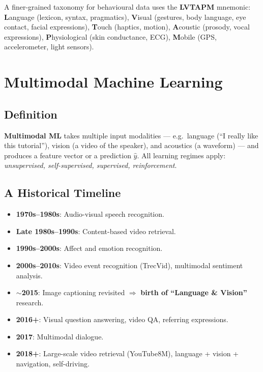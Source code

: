 \documentclass[11pt,a4paper]{article}
\theoremstyle{definition}
\theoremstyle{plain}
\theoremstyle{remark}
\begin{document}
A finer-grained taxonomy for behavioural data uses the \textbf{LVTAPM} mnemonic: \textbf{L}anguage (lexicon, syntax, pragmatics), \textbf{V}isual (gestures, body language, eye contact, facial expressions), \textbf{T}ouch (haptics, motion), \textbf{A}coustic (prosody, vocal expressions), \textbf{P}hysiological (skin conductance, ECG), \textbf{M}obile (GPS, accelerometer, light sensors).


\section{Multimodal Machine Learning}

\subsection{Definition}

\textbf{Multimodal ML} takes multiple input modalities --- e.g.\ language (``I really like this tutorial''), vision (a video of the speaker), and acoustics (a waveform) --- and produces a feature vector or a prediction $\hat{y}$. All learning regimes apply: \emph{unsupervised, self-supervised, supervised, reinforcement}.

\subsection{A Historical Timeline}

\begin{itemize}
    \item \textbf{1970s--1980s}: Audio-visual speech recognition.
    \item \textbf{Late 1980s--1990s}: Content-based video retrieval.
    \item \textbf{1990s--2000s}: Affect and emotion recognition.
    \item \textbf{2000s--2010s}: Video event recognition (TrecVid), multimodal sentiment analysis.
    \item \textbf{$\sim$2015}: Image captioning revisited $\Rightarrow$ \textbf{birth of ``Language \& Vision''} research.
    \item \textbf{2016+}: Visual question answering, video QA, referring expressions.
    \item \textbf{2017}: Multimodal dialogue.
    \item \textbf{2018+}: Large-scale video retrieval (YouTube8M), language + vision + navigation, self-driving.
\end{itemize}
\end{document}
